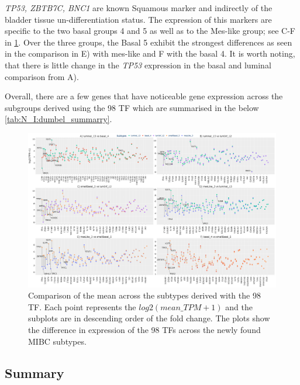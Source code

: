 \textit{TP53, ZBTB7C, BNC1} are known Squamous marker \citep{Robertson2023-na,Fishwick2017-kd} and indirectly of the bladder tissue un-differentiation status. The expression of this markers are specific to the two basal groups 4 and 5 as well as to the Mes-like group; see C-F in \cref{fig:N_I:dumbell_sel_tfs}.  Over the three groups, the Basal 5 exhibit the strongest differences as seen in the comparison in E) with mes-like and F with the basal 4. It is worth noting, that there is little change in the \textit{TP53} expression in the basal and luminal comparison from A). 

Overall, there are a few genes that have noticeable gene expression across the subgroups derived using the 98 TF which are summarised in the below \cref{tab:N_I:dumbel_summarry}.

\begin{figure}
    \centering
    \includegraphics[width=1.0\textwidth,keepaspectratio]{Sections/Network_I/Resources/selective_pruning/dumbell_sel_tfs.png}
      \caption[Mean gene expression across the five MIBC subgroups]{Comparison of the mean across the subtypes derived with the 98 TF. Each point represents the $log2(mean\_TPM+1)$ and the subplots are in descending order of the fold change. The plots show the difference in expression of the 98 TFs across the newly found MIBC subtypes.}
    \label{fig:N_I:dumbell_sel_tfs}
\end{figure}


\subsection{Summary}

